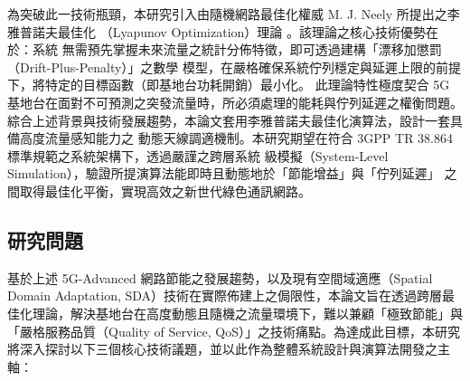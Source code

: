 為突破此一技術瓶頸，本研究引入由隨機網路最佳化權威 M. J. Neely 所提出之李雅普諾夫最佳化
（Lyapunov Optimization）理論 \cite{neely2012_lyapunov}。該理論之核心技術優勢在於：系統
無需預先掌握未來流量之統計分佈特徵，即可透過建構「漂移加懲罰（Drift-Plus-Penalty）」之數學
模型，在嚴格確保系統佇列穩定與延遲上限的前提下，將特定的目標函數（即基地台功耗開銷）最小化。
此理論特性極度契合 5G 基地台在面對不可預測之突發流量時，所必須處理的能耗與佇列延遲之權衡問題。
綜合上述背景與技術發展趨勢，本論文套用李雅普諾夫最佳化演算法，設計一套具備高度流量感知能力之
動態天線調適機制。本研究期望在符合 3GPP TR 38.864 標準規範之系統架構下，透過嚴謹之跨層系統
級模擬（System-Level Simulation），驗證所提演算法能即時且動態地於「節能增益」與「佇列延遲」
之間取得最佳化平衡，實現高效之新世代綠色通訊網路。





\subsection{研究問題}

基於上述 5G-Advanced 網路節能之發展趨勢，以及現有空間域適應（Spatial Domain Adaptation, SDA）技術在實際佈建上之侷限性，本論文旨在透過跨層最佳化理論，解決基地台在高度動態且隨機之流量環境下，難以兼顧「極致節能」與「嚴格服務品質（Quality of Service, QoS）」之技術痛點。為達成此目標，本研究將深入探討以下三個核心技術議題，並以此作為整體系統設計與演算法開發之主軸：

